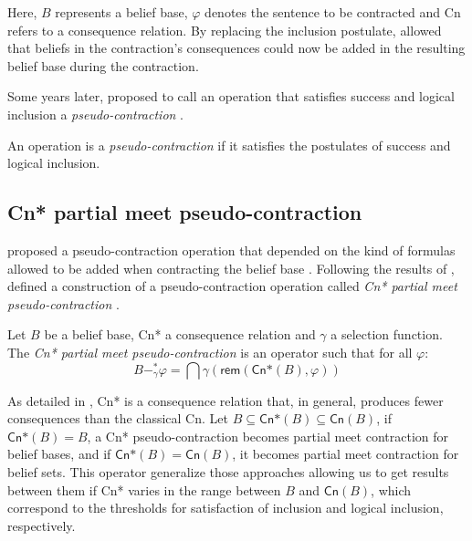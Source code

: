 Here, $B$ represents a belief base, $\varphi$ denotes the sentence to be contracted and \textsf{Cn} refers to a consequence relation. By replacing the inclusion postulate, \citeauthor{Hansson1989} allowed that beliefs in the contraction's consequences could now be added in the resulting belief base during the contraction.

Some years later, \citeauthor{Hansson1993a} proposed to call an operation that satisfies success and logical inclusion a \textit{pseudo-contraction} \citep{Hansson1993a}.

\begin{definition}
    An operation is a \textit{pseudo-contraction} if it satisfies the postulates of success and logical inclusion.
\end{definition}

\subsection{\textsf{Cn*} partial meet pseudo-contraction}
\label{subsec:partial-meet-pseudo-contraction}

\citeauthor{Santos2016} proposed a pseudo-contraction operation that depended on the kind of formulas allowed to be added when contracting the belief base \citep{Santos2016,Santos2018}. Following the results of \citet{Hansson1993a}, \citeauthor{Santos2016} defined a construction of a pseudo-contraction operation called \textit{\textsf{Cn*} partial meet pseudo-contraction} \citep{Santos2016}.

\begin{definition}
    Let $B$ be a belief base, \textsf{Cn*} a consequence relation and $\gamma$ a selection function. The \textit{\textsf{Cn*} partial meet pseudo-contraction} is an operator such that for all $\varphi$:
    $$B -_{\gamma}^{*} \varphi = \bigcap \gamma(\textsf{rem}(\textsf{Cn*}(B), \varphi))$$
\end{definition}

As detailed in \citet{Santos2018}, \textsf{Cn*} is a consequence relation that, in general, produces fewer consequences than the classical \textsf{Cn}. Let $B \subseteq \textsf{Cn*}(B) \subseteq \textsf{Cn}(B)$, if $\textsf{Cn*}(B) = B$, a \textsf{Cn*} pseudo-contraction becomes partial meet contraction for belief bases, and if $\textsf{Cn*}(B) = \textsf{Cn}(B)$, it becomes partial meet contraction for belief sets. This operator generalize those approaches allowing us to get results between them if \textsf{Cn*} varies in the range between $B$ and $\textsf{Cn}(B)$, which correspond to the thresholds for satisfaction of inclusion and logical inclusion, respectively.

